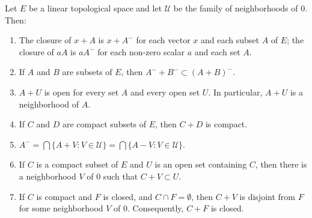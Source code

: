 Let $E$ be a linear topological space and let $\mathcal{U}$ be the family of neighborhoods of $0$. Then:
\begin{enumerate}
\item[(i)] The closure of $x + A$ is $x + A^-$ for each vector $x$ and each subset $A$ of $E$; the closure of $aA$ is $aA^-$ for each non-zero scalar $a$ and each set $A$.
\item[(ii)] If $A$ and $B$ are subsets of $E$, then $A^- + B^- \subset (A + B)^-$.
\item[(iii)] $A + U$ is open for every set $A$ and every open set $U$. In particular, $A + U$ is a neighborhood of $A$.
\item[(iv)] If $C$ and $D$ are compact subsets of $E$, then $C + D$ is compact.
\item[(v)] $A^- = \bigcap \{A + V : V \in \mathcal{U}\} = \bigcap \{A - V : V \in \mathcal{U}\}$.
\item[(vi)] If $C$ is a compact subset of $E$ and $U$ is an open set containing $C$, then there is a neighborhood $V$ of $0$ such that $C + V \subset U$.
\item[(vii)] If $C$ is compact and $F$ is closed, and $C \cap F = \emptyset$, then $C + V$ is disjoint from $F$ for some neighborhood $V$ of $0$. Consequently, $C + F$ is closed.
\end{enumerate}
